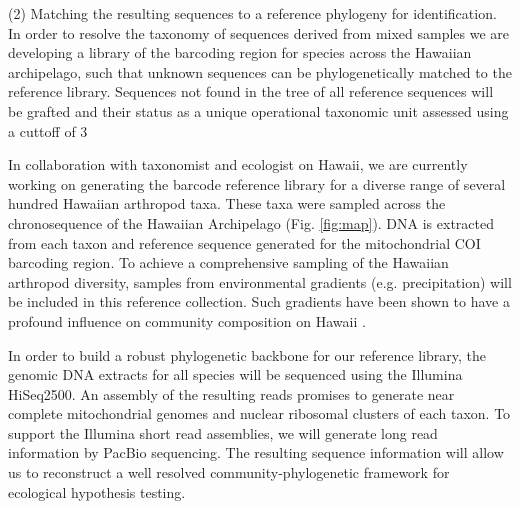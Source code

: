 \documentclass[11pt]{article}
\makeatletter
\renewcommand{\paragraph}{\@startsection{paragraph}{4}{\z@}
  {1ex \@plus 1ex \@minus .2ex}{-1em}
  {\normalfont\normalsize\it}
}
\makeatother
\begin{document}
\paragraph{(2) Matching the resulting sequences to a reference phylogeny for identification.}
In order to resolve the taxonomy of sequences derived from mixed samples we are developing a library of the barcoding region for species across the Hawaiian archipelago, such that unknown sequences can be phylogenetically matched \citep{} to the reference library.  Sequences not found in the tree of all reference sequences will be grafted and their status as a unique operational taxonomic unit assessed using a cuttoff of 3%

In collaboration with taxonomist and ecologist on Hawaii, we are currently working on generating the barcode reference library for a diverse range of several hundred Hawaiian arthropod taxa. These taxa were sampled across the chronosequence of the Hawaiian Archipelago (Fig. \ref{fig:map}). DNA is extracted from each taxon and reference sequence generated for the mitochondrial COI barcoding region. To achieve a comprehensive sampling of the Hawaiian arthropod diversity, samples from environmental gradients (e.g. precipitation) will be included in this reference collection. Such gradients have been shown to have a profound influence on community composition on Hawaii \citep{zimmermann2012}.

In order to build a robust phylogenetic backbone for our reference library, the genomic DNA extracts for all species will be sequenced using the Illumina HiSeq2500. An assembly of the resulting reads promises to generate near complete mitochondrial genomes and nuclear ribosomal clusters of each taxon. To support the Illumina short read assemblies, we will generate long read information by PacBio sequencing. The resulting sequence information will allow us to reconstruct a well resolved community-phylogenetic framework for ecological hypothesis testing.
\end{document}

